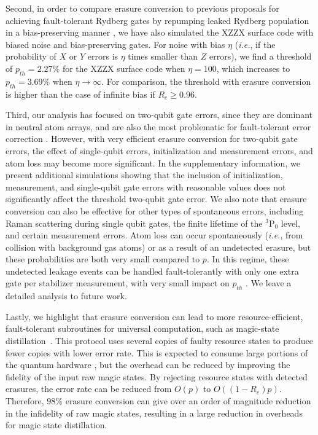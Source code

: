 \documentclass[%
reprint,
superscriptaddress,
 amsmath,amssymb,
 aps,
 prx,
floatfix,
]{revtex4-1}
\begin{document}
Second, in order to compare erasure conversion to previous proposals for achieving fault-tolerant Rydberg gates by repumping leaked Rydberg population in a bias-preserving manner \cite{cong2021}, we have also simulated the XZZX surface code with biased noise and bias-preserving gates. For noise with bias $\eta$ (\emph{i.e.}, if the probability of $X$ or $Y$ errors is $\eta$ times smaller than $Z$ errors), we find a threshold of $p_{th}=2.27\%$ for the XZZX surface code when $\eta = 100$, which increases to $p_{th} = 3.69\%$ when $\eta\rightarrow \infty$. For comparison, the threshold with erasure conversion is higher than the case of infinite bias if $R_e \geq 0.96$.

Third, our analysis has focused on two-qubit gate errors, since they are dominant in neutral atom arrays, and are also the most problematic for fault-tolerant error correction \cite{fowler2012a}. However, with very efficient erasure conversion for two-qubit gate errors, the effect of single-qubit errors, initialization and measurement errors, and atom loss may become more significant. In the supplementary information, we present additional simulations showing that the inclusion of initialization, measurement, and single-qubit gate errors with reasonable values does not significantly affect the threshold two-qubit gate error. We also note that erasure conversion can also be effective for other types of spontaneous errors, including Raman scattering during single qubit gates, the finite lifetime of the $^3$P$_0$ level, and certain measurement errors. Atom loss can occur spontaneously (\emph{i.e.}, from collision with background gas atoms) or as a result of an undetected erasure, but these probabilities are both very small compared to $p$. In this regime, these undetected leakage events can be handled fault-tolerantly with only one extra gate per stabilizer measurement, with very small impact on $p_{th}$ \cite{suchara2015}. We leave a detailed analysis to future work.

Lastly, we highlight that erasure conversion can lead to more resource-efficient, fault-tolerant subroutines for universal computation, such as magic-state distillation~\cite{bravyi2005universal}. This protocol uses several copies of faulty resource states to produce fewer copies with lower error rate. This is expected to consume large portions of the quantum hardware \cite{fowler2012a,fowler2013surface}, but the overhead can be reduced by improving the fidelity of the input raw magic states. By rejecting resource states with detected erasures, the error rate can be reduced from $O(p)$ \cite{horsman2012surface,landahl2014quantum,li2015magic,luo2021quantum} to $O((1-R_e)p)$. Therefore, $98\%$ erasure conversion can give over an order of magnitude reduction in the infidelity of raw magic states, resulting in a large reduction in overheads for magic state distillation. 
\end{document}
